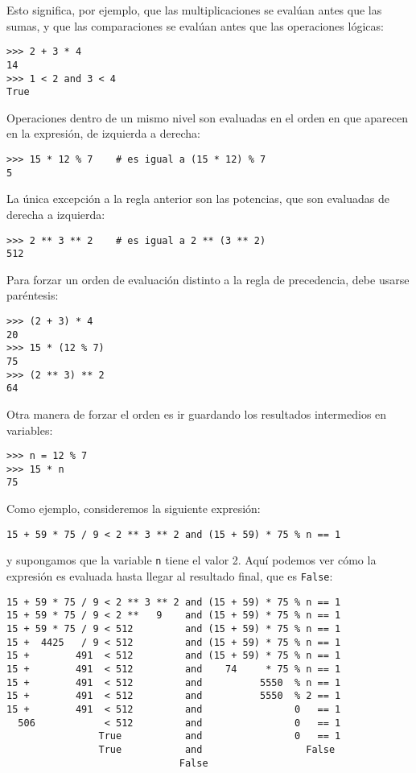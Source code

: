 Esto significa, por ejemplo, que las multiplicaciones se evalúan antes
que las sumas, y que las comparaciones se evalúan antes que las
operaciones lógicas:

\begin{lstlisting}
>>> 2 + 3 * 4
14
>>> 1 < 2 and 3 < 4
True
\end{lstlisting}

Operaciones dentro de un mismo nivel son evaluadas en el orden en que
aparecen en la expresión, de izquierda a derecha:

\begin{lstlisting}
>>> 15 * 12 % 7    # es igual a (15 * 12) % 7
5
\end{lstlisting}

La única excepción a la regla anterior son las potencias, que son
evaluadas de derecha a izquierda:

\begin{lstlisting}
>>> 2 ** 3 ** 2    # es igual a 2 ** (3 ** 2)
512
\end{lstlisting}

Para forzar un orden de evaluación distinto a la regla de precedencia,
debe usarse paréntesis:

\begin{lstlisting}
>>> (2 + 3) * 4
20
>>> 15 * (12 % 7)
75
>>> (2 ** 3) ** 2
64
\end{lstlisting}

Otra manera de forzar el orden es ir guardando los resultados
intermedios en variables:

\begin{lstlisting}
>>> n = 12 % 7
>>> 15 * n
75
\end{lstlisting}

Como ejemplo, consideremos la siguiente expresión:

\begin{lstlisting}
15 + 59 * 75 / 9 < 2 ** 3 ** 2 and (15 + 59) * 75 % n == 1
\end{lstlisting}

y supongamos que la variable \lstinline!n! tiene el valor 2. Aquí
podemos ver cómo la expresión es evaluada hasta llegar al resultado
final, que es \lstinline!False!:

\begin{lstlisting}
15 + 59 * 75 / 9 < 2 ** 3 ** 2 and (15 + 59) * 75 % n == 1
15 + 59 * 75 / 9 < 2 **   9    and (15 + 59) * 75 % n == 1
15 + 59 * 75 / 9 < 512         and (15 + 59) * 75 % n == 1
15 +  4425   / 9 < 512         and (15 + 59) * 75 % n == 1
15 +        491  < 512         and (15 + 59) * 75 % n == 1
15 +        491  < 512         and    74     * 75 % n == 1
15 +        491  < 512         and          5550  % n == 1
15 +        491  < 512         and          5550  % 2 == 1
15 +        491  < 512         and                0   == 1
  506            < 512         and                0   == 1
                True           and                0   == 1
                True           and                  False
                              False
\end{lstlisting}

